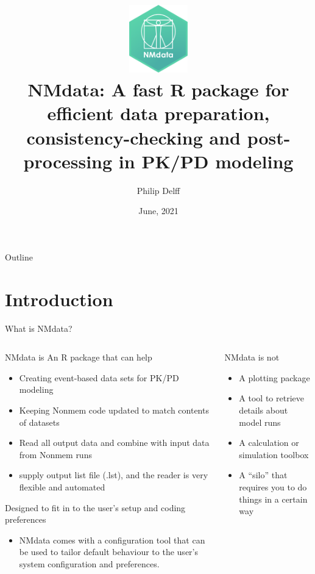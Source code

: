 \documentclass[
  8pt,
  ignorenonframetext,
  aspectratio=169]{beamer}
\title{\includegraphics[width=1in,height=\textheight]{NMdata_logo_v01.png}\\
NMdata: A fast R package for efficient data preparation,
consistency-checking and post-processing in PK/PD modeling}
\author{Philip Delff}
\date{June, 2021}
\providecommand{\tightlist}{%
  \setlength{\itemsep}{0pt}\setlength{\parskip}{0pt}}
\begin{document}
\frame{\titlepage}

\begin{frame}
\end{frame}

\begin{frame}{Outline}
\protect\hypertarget{outline}{}
\tableofcontents[hideallsubsections]
\end{frame}

\hypertarget{introduction}{%
\section{Introduction}\label{introduction}}

\begin{frame}{What is NMdata?}
\protect\hypertarget{what-is-nmdata}{}
\begin{columns}[T]
\begin{column}{0.48\textwidth}
\begin{block}{NMdata is}
\protect\hypertarget{nmdata-is}{}
An R package that can help

\begin{itemize}
\tightlist
\item
  Creating event-based data sets for PK/PD modeling
\item
  Keeping Nonmem code updated to match contents of datasets
\item
  Read all output data and combine with input data from Nonmem runs
\item
  supply output list file (.lst), and the reader is very flexible and
  automated
\end{itemize}

Designed to fit in to the user's setup and coding preferences

\begin{itemize}
\tightlist
\item
  NMdata comes with a configuration tool that can be used to tailor
  default behaviour to the user's system configuration and preferences.
\end{itemize}
\end{block}
\end{column}

\begin{column}{0.48\textwidth}
\begin{block}{NMdata is not}
\protect\hypertarget{nmdata-is-not}{}
\begin{itemize}
\item
  A plotting package
\item
  A tool to retrieve details about model runs
\item
  A calculation or simulation toolbox
\item
  A ``silo'' that requires you to do things in a certain way


\end{itemize}
\end{block}
\end{column}
\end{columns}
\end{frame}
\end{document}
